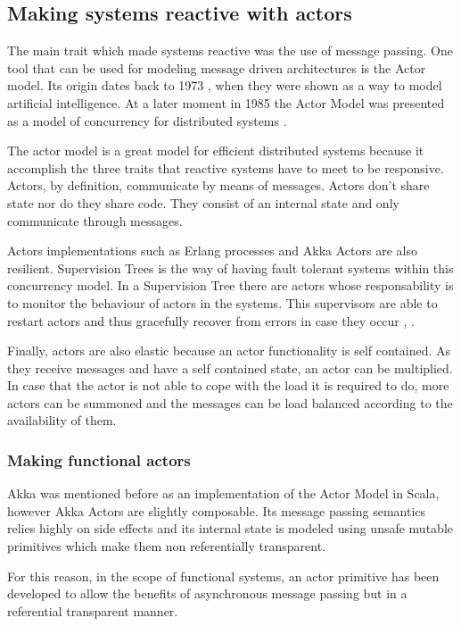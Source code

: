 \documentclass[../main.tex]{subfiles}
\begin{document}
\subsection{Making systems reactive with actors}
The main trait which made systems reactive was the use of message passing. One
tool that can be used for modeling message driven architectures is the Actor
model. Its origin dates back to  1973 \autocite{HewittAFormalism}, when they were shown as a way to
model artificial intelligence. At a later moment in 1985 the Actor Model was
presented as a model of concurrency for distributed systems \autocite{Agha1985ACTORS:Systems}.

The
actor model is a great model for efficient distributed systems because it
accomplish the three traits that reactive systems have to meet to be responsive.
Actors, by definition, communicate by means of messages. Actors don't share state nor do they share
code. They consist of an internal state and only communicate through messages.

Actors implementations such as Erlang processes and Akka Actors
are also resilient.
Supervision Trees is the way of having fault tolerant systems within this
concurrency model. In a Supervision Tree there are actors whose responsability
is to monitor the behaviour of actors in the systems. This supervisors are able to
restart actors and thus gracefully recover from errors in case they occur
\autocite{ErlangBehaviour}, \autocite{SupervisionDocumentation}.

Finally, actors are also elastic because an actor functionality is self
contained. As they receive messages and have a self contained state, an actor can be
multiplied. In case that the actor is not able to cope with the load it is
required to do, more actors can be summoned and the messages can be load balanced
according to the availability of them.

\subsubsection{Making functional actors}
Akka was mentioned before as an implementation of the Actor Model in Scala,
however Akka Actors are slightly composable. Its message passing semantics relies
highly on side effects and its internal state is modeled using unsafe mutable
primitives which make them non referentially transparent.

For this reason, in the scope of functional systems, an actor primitive has been
developed to allow the benefits of asynchronous message passing but in a
referential transparent manner.
\end{document}
